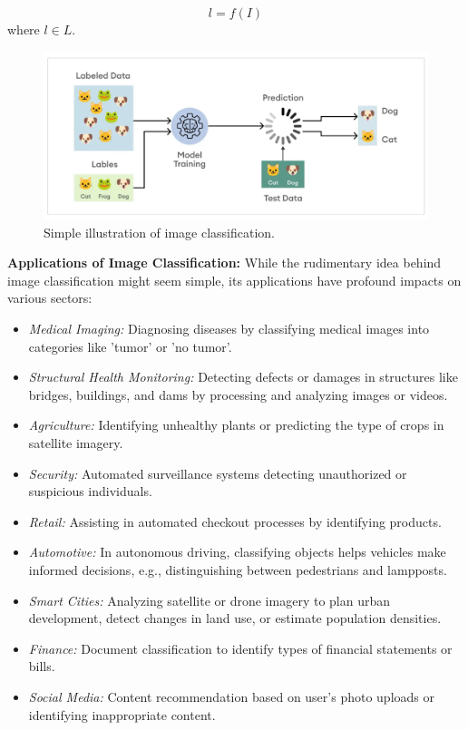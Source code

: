 \[ l = f(I) \]
where \( l \in L \).\\

\begin{figure}[htbp]
    \centering
    \includegraphics[scale=.5]{figures/image_classification.png}
    \caption{Simple illustration of image classification.~\cite{superannotate2023}}
    \label{fig:lenet}
\end{figure}

\textbf{Applications of Image Classification:}
While the rudimentary idea behind image classification might seem simple, its applications have profound impacts on various sectors:

\begin{itemize}
    \item \textit{Medical Imaging:} Diagnosing diseases by classifying medical images into categories like 'tumor' or 'no tumor'.
    \item \textit{Structural Health Monitoring:} Detecting defects or damages in structures like bridges, buildings, and dams by processing and analyzing images or videos. 
    \item \textit{Agriculture:} Identifying unhealthy plants or predicting the type of crops in satellite imagery.
    \item \textit{Security:} Automated surveillance systems detecting unauthorized or suspicious individuals.
    \item \textit{Retail:} Assisting in automated checkout processes by identifying products.
    \item \textit{Automotive:} In autonomous driving, classifying objects helps vehicles make informed decisions, e.g., distinguishing between pedestrians and lampposts.
    \item \textit{Smart Cities:} Analyzing satellite or drone imagery to plan urban development, detect changes in land use, or estimate population densities.
    \item \textit{Finance:} Document classification to identify types of financial statements or bills.
    \item \textit{Social Media:} Content recommendation based on user's photo uploads or identifying inappropriate content.
\end{itemize}

